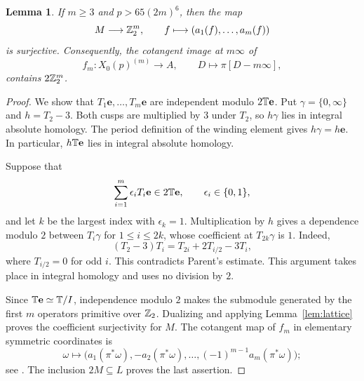 \documentclass[11pt]{article}
\newtheorem{lemma}[theorem]{Lemma}
\theoremstyle{remark}\newtheorem{remark}[theorem]{Remark}
\newcommand{\ee}{\mathbf e}
\begin{document}
\begin{lemma}\label{lem:jets}
If $m\geq3$ and $p>65(2m)^6$, then the map
\[
 M\longrightarrow\mathbb Z_2^m,\qquad
 f\longmapsto(a_1(f),\ldots,a_m(f))
\]
is surjective.
Consequently, the cotangent image at $m\infty$ of
\[
 f_m:X_0(p)^{(m)}\longrightarrow A,\qquad
 D\longmapsto\pi[D-m\infty],
\]
contains $2\mathbb Z_2^m$.
\end{lemma}
\begin{proof}
We show that $T_1\ee,\ldots,T_m\ee$ are independent modulo $2\T\ee$.
Put $\gamma=\{0,\infty\}$ and $h=T_2-3$.
Both cusps are multiplied by $3$ under $T_2$, so $h\gamma$ lies in
integral absolute homology. The period definition of the winding element
gives $h\gamma=h\ee$.
In particular, $h\T\ee$ lies in integral absolute homology.

Suppose that
\[
 \sum_{i=1}^m\epsilon_iT_i\ee\in2\T\ee,
 \qquad \epsilon_i\in\{0,1\},
\]
and let $k$ be the largest index with $\epsilon_k=1$.
Multiplication by $h$ gives a dependence modulo $2$ between
$T_i\gamma$ for $1\leq i\leq2k$, whose coefficient at $T_{2k}\gamma$
is $1$. Indeed,
\[
 (T_2-3)T_i=T_{2i}+2T_{i/2}-3T_i,
\]
where $T_{i/2}=0$ for odd $i$.
This contradicts Parent's estimate. This argument takes place in integral
homology and uses no division by $2$.

Since $\T\ee\simeq\T/I$, independence modulo $2$ makes the submodule
generated by the first $m$ operators primitive over $\mathbb Z_2$.
Dualizing and applying Lemma~\ref{lem:lattice} proves the coefficient
surjectivity for $M$.
The cotangent map of $f_m$ in elementary symmetric coordinates is
\[
 \omega\longmapsto
 \bigl(a_1(\pi^*\omega),-a_2(\pi^*\omega),\ldots,
 (-1)^{m-1}a_m(\pi^*\omega)\bigr);
\]
see \cite[Section~4.12]{Parent}.
The inclusion $2M\subseteq L$ proves the last assertion.
\end{proof}
\end{document}
